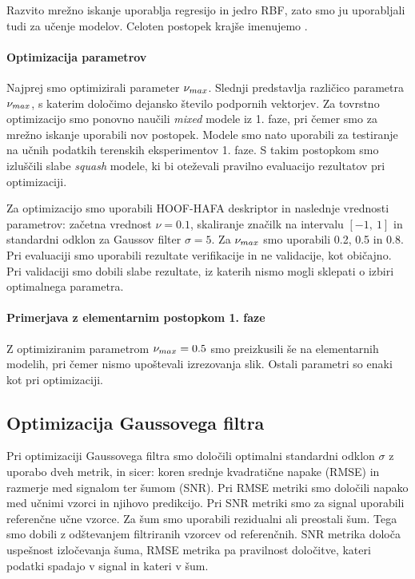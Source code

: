 Razvito mrežno iskanje uporablja regresijo \nusvr in jedro RBF, zato smo ju uporabljali tudi za učenje modelov. Celoten postopek krajše imenujemo \nurbf.


\paragraph{Optimizacija parametrov}
Najprej smo optimizirali parameter $\nu_{max}$. Slednji predstavlja različico parametra $\nu_{max}$, s katerim določimo dejansko število podpornih vektorjev. Za tovrstno optimizacijo smo ponovno naučili \textit{mixed} modele iz 1. faze, pri čemer smo za mrežno iskanje uporabili nov postopek. Modele smo nato uporabili za testiranje na učnih podatkih terenskih eksperimentov 1. faze. S takim postopkom smo izluščili slabe \textit{squash} modele, ki bi oteževali pravilno evaluacijo rezultatov pri optimizaciji.

Za optimizacijo smo uporabili HOOF-HAFA deskriptor in naslednje vrednosti parametrov: začetna vrednost $\nu=\num{0.1}$, skaliranje značilk na intervalu $[-1,~1]$ in standardni odklon za Gaussov filter $\sigma=5$. Za $\nu_{max}$ smo uporabili \num{0.2}, \num{0.5} in \num{0.8}. Pri evaluaciji smo uporabili rezultate verifikacije in ne validacije, kot običajno. Pri validaciji smo dobili slabe rezultate, iz katerih nismo mogli sklepati o izbiri optimalnega parametra.

\paragraph{Primerjava z elementarnim postopkom 1. faze}
Z optimiziranim parametrom $\nu_{max}=\num{0.5}$ smo \nurbf preizkusili še na elementarnih modelih, pri čemer nismo upoštevali izrezovanja slik. Ostali parametri so enaki kot pri optimizaciji.



\subsection{Optimizacija Gaussovega filtra}
Pri optimizaciji Gaussovega filtra smo določili optimalni standardni odklon $\sigma$ z uporabo dveh metrik, in sicer: koren srednje kvadratične napake (RMSE) in razmerje med signalom ter šumom (SNR). Pri RMSE metriki smo določili napako med učnimi vzorci in njihovo predikcijo. Pri SNR metriki smo za signal uporabili referenčne učne vzorce. Za šum smo uporabili rezidualni ali preostali šum. Tega smo dobili z odštevanjem filtriranih vzorcev od referenčnih. SNR metrika določa uspešnost izločevanja šuma, RMSE metrika pa pravilnost določitve, kateri podatki spadajo v signal in kateri v šum.

